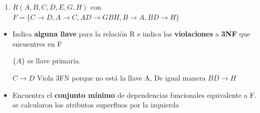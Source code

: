 \documentclass{article}
\begin{document}
\begin{enumerate}
\begin{enumerate}
        $\{A\}+ = \{AC\}, B$ no es superfluo
        
        $AB \rightarrow C \rightarrowtriangle B \rightarrow C:$
        
        $\{B\}+ = \{BDEFC\}, A$ no es superfluo
        
        No hay cambios.
        
        Ahora por la derecha:
        
        $B \rightarrow DE \rightarrowtriangle B \rightarrow D:$
        
        $\{B\}+ = \{BDF\}, E$ no es superfluo
        
        $B \rightarrow DE \rightarrowtriangle B \rightarrow E:$
        
        $\{B\}+ = \{BE\}, D$ no es superfluo
        
        No hay cambios.

        $F = \{ B \rightarrow DE, D \rightarrow F, AB \rightarrow C\}$ es un conjunto mínimo.
        
        $S(B, D, E), T(D, F), U(A, B, C)$ no son subconjunto entre ellos.
        
        La llave candidata $AB (\{AB\}+ = \{ABCDEF\})$ se encuentra en $U$, por lo que terminamos con la normalización, y nos queda:
        
        $S(B, D, E), T(D, F), U(A, B, C)$

        
        \item $R (A, B, C, D, E, G, H)$ con $F = \{C \rightarrow D, A \rightarrow C, AD \rightarrow GBH, B \rightarrow A, BD \rightarrow H\}$ 
        
    \end{enumerate}
    

     \begin{itemize}
         \item Indica \textbf{alguna llave} para la relación R e indica las \textbf{violaciones} a \textbf{3NF} que encuentres en F
         
            $\{A\}$ es llave primaria.
            
            $C \rightarrow D$ Viola 3FN porque no está la llave A,
            De igual manera $ BD \rightarrow H$
         
         \item Encuentra el \textbf{conjunto mínimo} de dependencias funcionales equivalente a F.
        se calcularon los atributos superfluos por la izquierda 
        

\end{itemize}
\end{enumerate}
\end{document}
